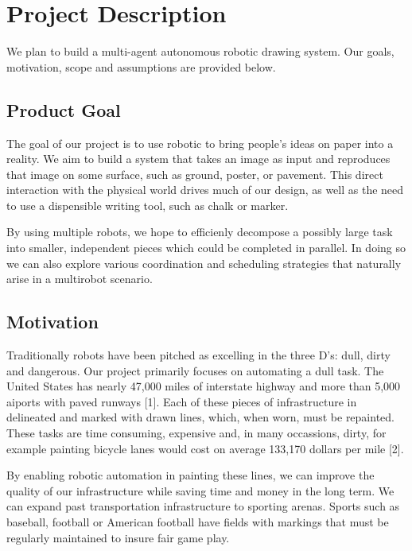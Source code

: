 
\section{Project Description}
\label{sec:project_description}
We plan to build a multi-agent autonomous robotic drawing system. Our goals, motivation, scope and assumptions are provided below.

\subsection{Product Goal}
\label{sec:project_goal}
The goal of our project is to use robotic to bring people's ideas on paper into a reality. 
We aim to build a system that takes an image as input and reproduces that image on some surface, such as ground, poster, or pavement.
This direct interaction with the physical world drives much of our design, as well as the need to use a dispensible writing tool, such as chalk or marker. 

By using multiple robots, we hope to efficienly decompose a possibly large task into smaller, independent pieces which could be completed in parallel.
In doing so we can also explore various coordination and scheduling strategies that naturally arise in a multirobot scenario. 

\subsection{Motivation}
\label{sec:motivation}

Traditionally robots have been pitched as excelling in the three D's: dull, dirty and dangerous. Our project primarily focuses on automating a dull task. The United States has nearly 47,000 miles of interstate highway and more than 5,000 aiports with paved runways [1]. Each of these pieces of infrastructure in delineated and marked with drawn lines, which, when worn, must be repainted. These tasks are time consuming, expensive and, in many occassions, dirty, for example painting bicycle lanes would cost on average 133,170 dollars per mile [2].

By enabling robotic automation in painting these lines, we can improve the quality of our infrastructure while saving time and money in the long term. We can expand past transportation infrastructure to sporting arenas. Sports such as baseball, football or American football have fields with markings that must be regularly maintained to insure fair game play. 

